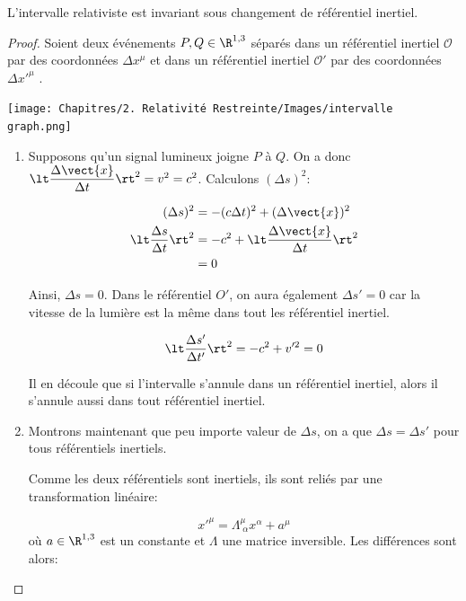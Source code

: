 \begin{theoremframe}
    \begin{propri}
        L'intervalle relativiste est invariant sous changement de référentiel inertiel.
    \end{propri}
\end{theoremframe}
\begin{proof}
    Soient deux événements $P,Q \in \R^{1,3}$ séparés dans un référentiel inertiel $\mathcal{O}$ par des coordonnées $\Delta x^{\mu}$ et dans un référentiel inertiel $\mathcal{O}'$ par des coordonnées $\Delta x'^{\mu}$ .

\begin{center}
\texttt{[image: Chapitres/2. Relativité Restreinte/Images/intervalle graph.png]}
\end{center}
\begin{enumerate}
    \item Supposons qu'un signal lumineux joigne $P$ à $Q$. On a donc $\lt \dfrac{\Delta \vect{x}}{\Delta t} \rt^2 = v^2 = c^2$. Calculons $(\Delta s )^2$:

\begin{align}
    (\Delta s )^2  & = -(c\Delta t)^2 + (\Delta \vect{x})^2\\
    \lt\frac{\Delta s}{\Delta t}\rt^2 & = -c^2 + \lt \frac{\Delta \vect{x}}{\Delta t} \rt^2\\
    & =0
\end{align}

Ainsi, $\Delta s = 0$. Dans le référentiel $O'$, on aura également $\Delta s' = 0$  car la vitesse de la lumière est la même dans tout les référentiel inertiel.

\begin{equation}
    \lt \frac{\Delta s'}{\Delta t'} \rt^2 = -c^2 + v'^2 = 0
\end{equation}

Il en découle que si l'intervalle s'annule dans un référentiel inertiel, alors il s'annule aussi dans tout référentiel inertiel. 
\item Montrons maintenant que peu importe valeur de $\Delta s$, on a que $\Delta s = \Delta s' $ pour tous référentiels inertiels.

 

Comme les deux référentiels sont inertiels, ils sont reliés par une transformation linéaire: 

\begin{equation}
    x'^{\mu} = \Lambda^{\mu}_{ \; \alpha} x^{\alpha} + a^{\mu}
    \label{def:poincaré}
\end{equation}
où $a\in \R^{1,3}$ est un constante et $\Lambda$ une matrice inversible. Les différences sont alors:


\end{enumerate}
\end{proof}
